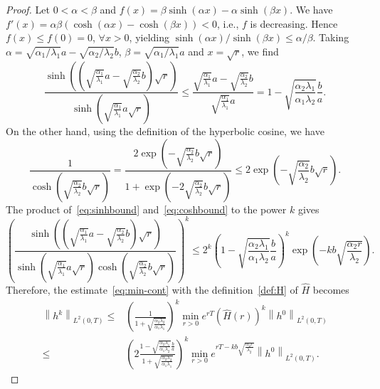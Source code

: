 \documentclass[10pt,a4paper]{amsart}
\newcommand{\norm}[1]{\left\lVert#1\right\rVert}
\begin{document}
\begin{proof}
Let $0<\alpha<\beta$ and $f(x) = \beta\sinh(\alpha x) - \alpha \sinh(\beta x)$. We have $f'(x) = \alpha\beta(\cosh(\alpha x) - \cosh(\beta x)) < 0$, i.e., $f$ is decreasing. Hence $f(x) \leq f(0) = 0$, $\forall x>0$, yielding $\sinh(\alpha x) / \sinh(\beta x) \leq \alpha / \beta$. Taking $\alpha = \sqrt{\alpha_1/\lambda_1} a - \sqrt{\alpha_2/\lambda_2} b$, $\beta = \sqrt{\alpha_1/\lambda_1} a$ and $x = \sqrt{r}$, we find
\begin{equation}\label{eq:sinhbound}
\frac{\sinh\left((\sqrt{\frac{\alpha_1}{\lambda_1}} a - \sqrt{\frac{\alpha_2}{\lambda_2}} b) \sqrt{r} \right)}{\sinh\left(\sqrt{\frac{\alpha_1}{\lambda_1}} a \sqrt{r}\right)}\leq \frac{\sqrt{\frac{\alpha_1}{\lambda_1}} a - \sqrt{\frac{\alpha_2}{\lambda_2}} b}{\sqrt{\frac{\alpha_1}{\lambda_1}} a} = 1 - \sqrt{\frac{\alpha_2 \lambda_1}{\alpha_1\lambda_2}}\frac{b}{a}.
\end{equation}
On the other hand, using the definition of the hyperbolic cosine, we have
\begin{equation}\label{eq:coshbound}
\frac{1}{\cosh\left(\sqrt{\frac{\alpha_2}{\lambda_2}} b \sqrt{r} \right)} 
= \frac{2 \exp\left(-\sqrt{\frac{\alpha_2}{\lambda_2}} b \sqrt{r}\right)}{1 + \exp \left(-2\sqrt{\frac{\alpha_2}{\lambda_2}} b \sqrt{r} \right)} 
\leq 2 \exp\left(-\sqrt{\frac{\alpha_2}{\lambda_2}} b\sqrt{r}\right).
\end{equation}
The product of~\eqref{eq:sinhbound} and~\eqref{eq:coshbound} to the power $k$ gives
\begin{equation}\label{eq:BoundThm2}
\left(\frac{\sinh\left(\left(\sqrt{\frac{\alpha_1}{\lambda_1}} a - \sqrt{\frac{\alpha_2}{\lambda_2}} b\right) \sqrt{r} \right)}{\sinh\left(\sqrt{\frac{\alpha_1}{\lambda_1}} a \sqrt{r}\right)\cosh\left(\sqrt{\frac{\alpha_2}{\lambda_2}} b \sqrt{r}\right)}\right)^k
\leq 2^k\left(1 - \sqrt{\frac{\alpha_2 \lambda_1}{\alpha_1\lambda_2}}\frac{b}{a}\right)^k \exp\left(-kb\sqrt{\frac{\alpha_2r}{\lambda_2}}\right).
\end{equation}
Therefore, the estimate~\eqref{eq:min-cont} with the definition~\eqref{def:H} of $\hat H$ becomes
\begin{equation}\label{eq:minBoundThm2}
\begin{aligned}
\norm{h^k}_{L^2(0, T)} \leq& \left(\frac{1}{1+\sqrt{\frac{\alpha_2\lambda_2}{\alpha_1\lambda_1}}}\right)^k\min_{r>0}e^{rT} \left(\hat H(r)\right)^k \norm{h^0}_{L^2(0, T)}
\\
\leq& \left(2\frac{1 - \sqrt{\frac{\alpha_2 \lambda_1}{\alpha_1\lambda_2}}\frac{b}{a}}{1 + \sqrt{\frac{\alpha_2 \lambda_2}{\alpha_1\lambda_1}}} \right)^k \min_{r>0}e^{rT - kb\sqrt{\frac{\alpha_2r}{\lambda_2}}}\norm{h^0}_{L^2(0, T)}.
\end{aligned}
\end{equation}


\end{proof}
\end{document}

